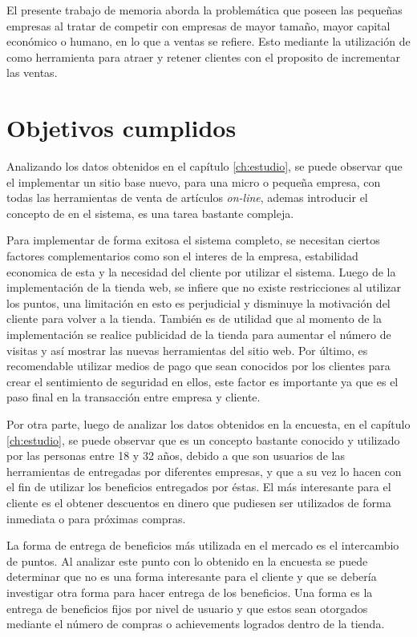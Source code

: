 El presente trabajo de memoria aborda la problemática que poseen las pequeñas
empresas al tratar de competir con empresas de mayor tamaño, mayor capital
económico o humano, en lo que a ventas se refiere. Esto mediante la utilización de {\gam} 
como herramienta para atraer y retener clientes con el proposito de incrementar las ventas.

\section{Objetivos cumplidos}


Analizando los datos obtenidos en el capítulo \ref{ch:estudio}, se puede observar que el
implementar un sitio base nuevo, para una micro o pequeña empresa, con todas las
herramientas de venta de artículos \emph{on-line}, ademas introducir el concepto de {\gam} en el sistema,
 es una tarea bastante compleja.

Para implementar de forma exitosa el sistema completo, se necesitan ciertos factores
complementarios como son el interes de la empresa, estabilidad economica de esta y la necesidad del cliente 
por utilizar el sistema. Luego de la implementación de la tienda web, 
se infiere que no existe restricciones al utilizar los puntos, una limitación
en esto es perjudicial y disminuye la motivación del cliente para volver a la tienda. 
También es de utilidad que al momento de la implementación se realice publicidad
de la tienda para aumentar el número de visitas y así mostrar las nuevas herramientas
del sitio web. Por último, es recomendable utilizar medios de pago que sean conocidos
por los clientes para crear el sentimiento de seguridad en ellos, este factor es importante
ya que es el paso final en la transacción entre empresa y cliente. 

Por otra parte, luego de analizar los datos obtenidos en la encuesta, en el capítulo \ref{ch:estudio},
 se puede observar que {\gam} es un concepto bastante conocido y utilizado por las personas 
entre 18 y 32 años, debido a que son usuarios de las herramientas de {\gam} entregadas por
diferentes empresas, y que a su vez lo hacen con el fin de utilizar los beneficios entregados 
por éstas. El más interesante para el cliente es el obtener descuentos en dinero
que pudiesen ser utilizados de forma inmediata o para próximas compras.

La forma de entrega de beneficios más utilizada en el mercado es el intercambio de puntos. 
Al analizar este punto con lo obtenido en la encuesta se puede determinar que no es 
una forma interesante para el cliente y que se debería investigar otra forma para 
hacer entrega de los beneficios. Una forma es la entrega de beneficios fijos por nivel 
de usuario y que estos sean otorgados mediante el número de compras o achievements logrados
dentro de la tienda.

